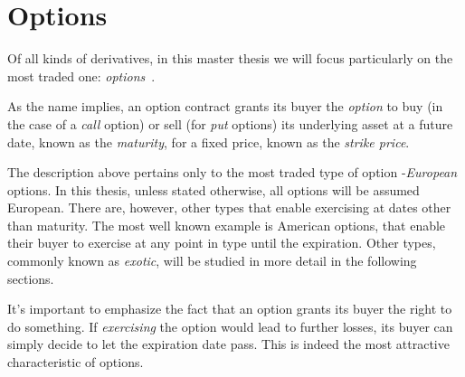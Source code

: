 \section{Options}
\label{section:options}
Of all kinds of derivatives, in this master thesis we will focus particularly on the most traded one: \emph{options}~\cite{Hull}.

As the name implies, an option contract grants its buyer the \emph{option} to buy (in the case of a \emph{call} option) or sell (for \emph{put} options) its underlying asset at a future date, known as the \emph{maturity}, for a fixed price, known as the \emph{strike price}.

The description above pertains only to the most traded type of option -\emph{European} options. In this thesis, unless stated otherwise, all options will be assumed European. There are, however, other types that enable exercising at dates other than maturity.
The most well known example is American options, that enable their buyer to exercise at any point in type until the expiration.
Other types, commonly known as \emph{exotic}, will be studied in more detail in the following sections.


It's important to emphasize the fact that an option grants its buyer the right to do something. If \emph{exercising} the option would lead to further losses, its buyer can simply decide to let the expiration date pass. This is indeed the most attractive characteristic of options.


\iffalse
\subsection{European and American Options}
\label{subsection:european and american options}
Options are also categorized by the period at which the buyer is allowed to exercise his right. The two most traded types are European and American options.
With an European option, an investor is only able to exercise the contract at the expiration date. The value of the underlying asset up to that point in time is irrelevant.
As for American options, the buyer can exercise the contract at any moment up to the expiration date.
In this case, the investor is faced with an optimal-stopping problem: when is the best time to exercise the option?
For this very reason, it should be clear that American options are significantly more difficult to study than their European counterparts.
\fi


